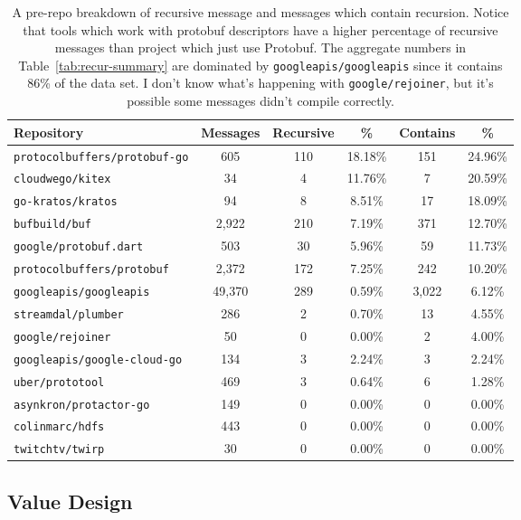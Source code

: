 \begin{table}[H]
\centering
\begin{tabular}{lccccc}
    \toprule
    Repository & Messages & Recursive & \% & Contains & \% \\
    \midrule
    \texttt{protocolbuffers/protobuf-go} & 605 & 110 & 18.18\% & 151 & 24.96\% \\
    \texttt{cloudwego/kitex} & 34 & 4 & 11.76\% & 7 & 20.59\% \\
    \texttt{go-kratos/kratos} & 94 & 8 & 8.51\% & 17 & 18.09\% \\
    \texttt{bufbuild/buf} & 2,922 & 210 & 7.19\% & 371 & 12.70\% \\
    \texttt{google/protobuf.dart} & 503 & 30 & 5.96\% & 59 & 11.73\% \\
    \texttt{protocolbuffers/protobuf} & 2,372 & 172 & 7.25\% & 242 & 10.20\% \\
    \texttt{googleapis/googleapis} & 49,370 & 289 & 0.59\% & 3,022 & 6.12\% \\
    \texttt{streamdal/plumber} & 286 & 2 & 0.70\% & 13 & 4.55\% \\
    \texttt{google/rejoiner} & 50 & 0 & 0.00\% & 2 & 4.00\% \\
    \texttt{googleapis/google-cloud-go} & 134 & 3 & 2.24\% & 3 & 2.24\% \\
    \texttt{uber/prototool} & 469 & 3 & 0.64\% & 6 & 1.28\% \\
    \texttt{asynkron/protactor-go} & 149 & 0 & 0.00\% & 0 & 0.00\% \\
    \texttt{colinmarc/hdfs} & 443 & 0 & 0.00\% & 0 & 0.00\% \\
    \texttt{twitchtv/twirp} & 30 & 0 & 0.00\% & 0 & 0.00\% \\
    \bottomrule
\end{tabular}
\caption[Per-repo recursive message breakdown]{A pre-repo breakdown of
    recursive message and messages which contain recursion. Notice that tools
    which work with protobuf descriptors have a higher percentage of recursive
    messages than project which just use Protobuf. The aggregate numbers in
    Table~\ref{tab:recur-summary} are dominated by
    \texttt{googleapis/googleapis} since it contains 86\% of the data set. I
    don't know what's happening with \texttt{google/rejoiner}, but it's
    possible some messages didn't compile correctly.}\label{tab:recur-repos}
\end{table}

\subsection{Value Design}


